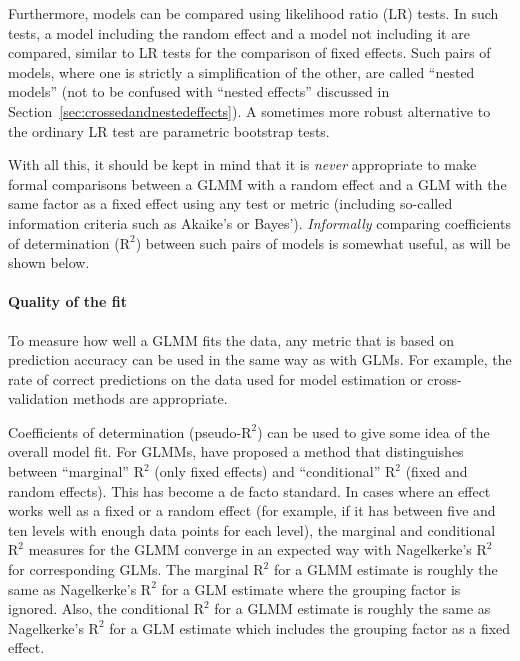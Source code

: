 Furthermore, models can be compared using likelihood ratio (LR) tests.
In such tests, a model including the random effect and a model not including it are compared, similar to LR tests for the comparison of fixed effects.
Such pairs of models, where one is strictly a simplification of the other, are called ``nested models'' (not to be confused with ``nested effects'' discussed in Section~\ref{sec:crossedandnestedeffects}).
A sometimes more robust alternative to the ordinary LR test are parametric bootstrap tests. 

With all this, it should be kept in mind that it is \textit{never} appropriate to make formal comparisons between a GLMM with a random effect and a GLM with the same factor as a fixed effect using any test or metric (including so-called information criteria such as Akaike's or Bayes').
\textit{Informally} comparing coefficients of determination ($\textrm{R}^{\textrm{2}}$) between such pairs of models is somewhat useful, as will be shown below.

\paragraph{Quality of the fit}

To measure how well a GLMM fits the data, any metric that is based on prediction accuracy can be used in the same way as with GLMs.
For example, the rate of correct predictions on the data used for model estimation or cross-validation methods are appropriate.

Coefficients of determination (pseudo-$\textrm{R}^{\textrm{2}}$) can be used to give some idea of the overall model fit.
For GLMMs, \citet{NakagawaSchielzeth2013} have proposed a method that distinguishes between ``marginal'' $\textrm{R}^{\textrm{2}}$ (only fixed effects) and ``conditional'' $\textrm{R}^{\textrm{2}}$ (fixed and random effects).
This has become a de facto standard.
In cases where an effect works well as a fixed or a random effect (for example, if it has between five and ten levels with enough data points for each level), the marginal and conditional $\textrm{R}^{\textrm{2}}$ measures for the GLMM converge in an expected way with Nagelkerke's $\textrm{R}^{\textrm{2}}$ for corresponding GLMs.
The marginal $\textrm{R}^{\textrm{2}}$ for a GLMM estimate is roughly the same as Nagelkerke's $\textrm{R}^{\textrm{2}}$ for a GLM estimate where the grouping factor is ignored.
Also, the conditional $\textrm{R}^{\textrm{2}}$ for a GLMM estimate is roughly the same as Nagelkerke's $\textrm{R}^{\textrm{2}}$ for a GLM estimate which includes the grouping factor as a fixed effect.


